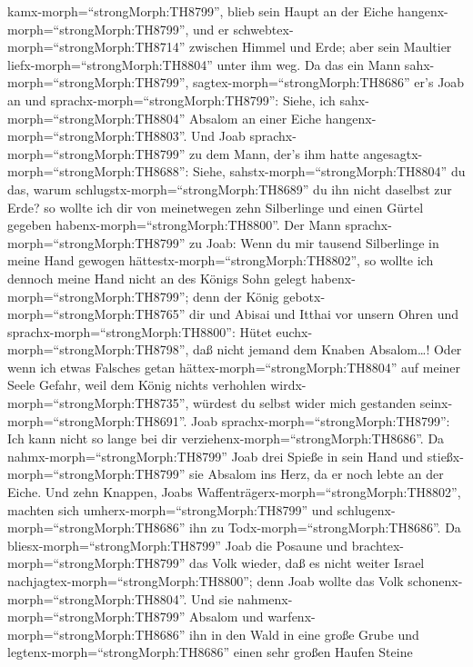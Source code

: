 kamx-morph=``strongMorph:TH8799'', blieb sein Haupt an der Eiche
hangenx-morph=``strongMorph:TH8799'', und er
schwebtex-morph=``strongMorph:TH8714'' zwischen Himmel und Erde; aber
sein Maultier liefx-morph=``strongMorph:TH8804'' unter ihm weg.
 Da das ein Mann sahx-morph=``strongMorph:TH8799'',
sagtex-morph=``strongMorph:TH8686'' er's Joab an und
sprachx-morph=``strongMorph:TH8799'': Siehe, ich
sahx-morph=``strongMorph:TH8804'' Absalom an einer Eiche
hangenx-morph=``strongMorph:TH8803''.  Und Joab
sprachx-morph=``strongMorph:TH8799'' zu dem Mann, der's ihm hatte
angesagtx-morph=``strongMorph:TH8688'': Siehe,
sahstx-morph=``strongMorph:TH8804'' du das, warum
schlugstx-morph=``strongMorph:TH8689'' du ihn nicht daselbst zur Erde?
so wollte ich dir von meinetwegen zehn Silberlinge und einen Gürtel
gegeben habenx-morph=``strongMorph:TH8800''.  Der Mann
sprachx-morph=``strongMorph:TH8799'' zu Joab: Wenn du mir tausend
Silberlinge in meine Hand gewogen hättestx-morph=``strongMorph:TH8802'',
so wollte ich dennoch meine Hand nicht an des Königs Sohn gelegt
habenx-morph=``strongMorph:TH8799''; denn der König
gebotx-morph=``strongMorph:TH8765'' dir und Abisai und Itthai vor unsern
Ohren und sprachx-morph=``strongMorph:TH8800'': Hütet
euchx-morph=``strongMorph:TH8798'', daß nicht jemand dem Knaben
Absalom\ldots!  Oder wenn ich etwas Falsches getan
hättex-morph=``strongMorph:TH8804'' auf meiner Seele Gefahr, weil dem
König nichts verhohlen wirdx-morph=``strongMorph:TH8735'', würdest du
selbst wider mich gestanden seinx-morph=``strongMorph:TH8691''.
 Joab sprachx-morph=``strongMorph:TH8799'': Ich kann nicht
so lange bei dir verziehenx-morph=``strongMorph:TH8686''. Da
nahmx-morph=``strongMorph:TH8799'' Joab drei Spieße in sein Hand und
stießx-morph=``strongMorph:TH8799'' sie Absalom ins Herz, da er noch
lebte an der Eiche.  Und zehn Knappen, Joabs
Waffenträgerx-morph=``strongMorph:TH8802'', machten sich
umherx-morph=``strongMorph:TH8799'' und
schlugenx-morph=``strongMorph:TH8686'' ihn zu
Todx-morph=``strongMorph:TH8686''.  Da
bliesx-morph=``strongMorph:TH8799'' Joab die Posaune und
brachtex-morph=``strongMorph:TH8799'' das Volk wieder, daß es nicht
weiter Israel nachjagtex-morph=``strongMorph:TH8800''; denn Joab wollte
das Volk schonenx-morph=``strongMorph:TH8804''.  Und sie
nahmenx-morph=``strongMorph:TH8799'' Absalom und
warfenx-morph=``strongMorph:TH8686'' ihn in den Wald in eine große Grube
und legtenx-morph=``strongMorph:TH8686'' einen sehr großen Haufen Steine
